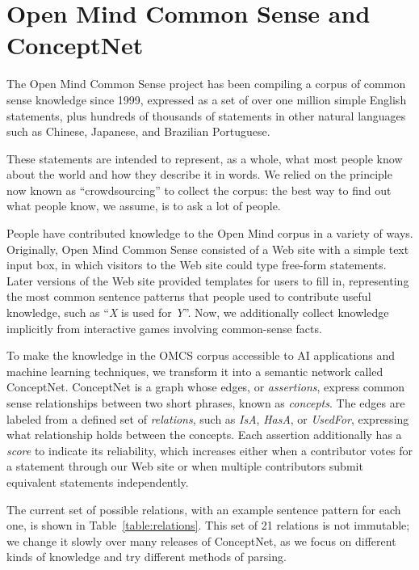 \documentclass[11pt]{article}
\begin{document}
\section{Open Mind Common Sense and ConceptNet}

The Open Mind Common Sense project has been compiling a corpus of common sense knowledge since 1999, expressed as a set of over one million simple English statements, plus hundreds of thousands of statements in other natural languages such as Chinese, Japanese, and Brazilian Portuguese.

These statements are intended to represent, as a whole, what most people know about the world and how they describe it in words. We relied on the principle now known as ``crowdsourcing'' to collect the corpus: the best way to find out what people know, we assume, is to ask a lot of people.

People have contributed knowledge to the Open Mind corpus in a variety of ways.
Originally, Open Mind Common Sense consisted of a Web site with a simple text
input box, in which visitors to the Web site could type free-form statements.
Later versions of the Web site provided templates for users to fill in,
representing the most common sentence patterns that people used to contribute
useful knowledge, such as ``{\em X} is used for {\em Y}''. Now, we additionally
collect knowledge implicitly from interactive games involving common-sense
facts.

To make the knowledge in the OMCS corpus accessible to AI applications and
machine learning techniques, we transform it into a semantic network called
ConceptNet. ConceptNet is a graph whose edges, or {\em assertions}, express
common sense relationships between two short phrases, known as {\em concepts}.
The edges are labeled from a defined set of {\em relations}, such as {\em
IsA}, {\em HasA}, or {\em UsedFor}, expressing what relationship holds between
the concepts.  Each assertion additionally has a {\em score} to indicate its
reliability, which increases either when a contributor votes for a statement
through our Web site or when multiple contributors submit equivalent statements
independently.

The current set of possible relations, with an example sentence pattern for
each one, is shown in Table~\ref{table:relations}. This set of 21 relations is
not immutable; we change it slowly over many releases of ConceptNet, as we
focus on different kinds of knowledge and try different methods of parsing.
\end{document}
